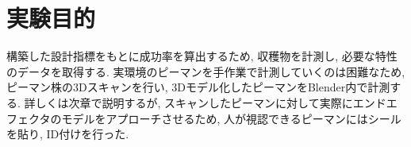 \section{実験目的}
構築した設計指標をもとに成功率を算出するため, 収穫物を計測し, 必要な特性のデータを取得する.
実環境のピーマンを手作業で計測していくのは困難なため, ピーマン株の3Dスキャンを行い, 3Dモデル化したピーマンをBlender内で計測する.
詳しくは次章で説明するが, スキャンしたピーマンに対して実際にエンドエフェクタのモデルをアプローチさせるため, 人が視認できるピーマンにはシールを貼り, ID付けを行った.
